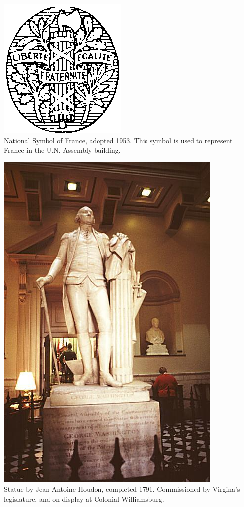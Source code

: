 \begin{frame}
    \centering
    \includegraphics[height=.8\textheight]{img/fasces/french-republic-symbol.png} \\
    National Symbol of France, adopted 1953. This symbol is used to represent France in the U.N. Assembly building. \\
\end{frame}
\begin{frame}
    \centering
    \includegraphics[height=.8\textheight]{img/fasces/houdon-front.jpg} \\
    Statue by Jean-Antoine Houdon, completed 1791. Commissioned by Virgina's legislature, and on display at Colonial Williamsburg. \\
\end{frame}
